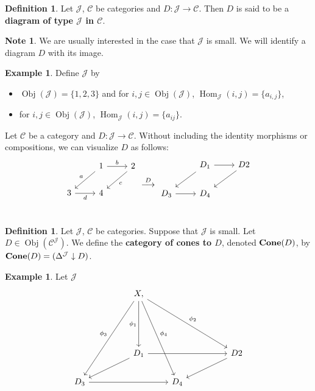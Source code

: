 \documentclass{book}
\theoremstyle{definition}
\newtheorem{defn}[definition]{Definition}
\newtheorem{note}[definition]{Note}
\newtheorem{exmp}[definition]{Example}
\newcommand{\Del}{\Delta}
\newcommand{\MC}{\mathcal{C}}
\newcommand{\MJ}{\mathcal{J}}
\DeclareMathOperator{\Obj}{Obj}
\DeclareMathOperator{\Hom}{Hom}
\DeclareMathOperator*{\0}{\mbf{0}}
\DeclareMathOperator*{\1}{\mbf{1}}
\DeclareMathOperator*{\Cone}{\text{\tbf{Cone}}}
\newcommand{\tbf}[1]{\textbf{#1}}
\begin{document}
	\begin{defn}
		Let $\MJ$, $\MC$ be categories and $D: \MJ \rightarrow \MC$. Then $D$ is said to be a \textbf{diagram of type $\MJ$ in $\MC$}.
	\end{defn}

	\begin{note}
		We are usually interested in the case that $\MJ$ is small. We will identify a diagram $D$ with its image. 
	\end{note}

	\begin{exmp}
		Define $\MJ$ by
		\begin{itemize}
			\item  $\Obj(\MJ) = \{1, 2, 3\}$ and for $i,j \in \Obj(\MJ)$, $\Hom_{\MJ}(i, j) = \{a_{i,j}\}$,
			\item for $i,j \in \Obj(\MJ)$, $\Hom_{\MJ}(i,j) = \{a_{ij}\}$.
		\end{itemize}
		Let $\MC$ be a category and $D: \MJ \rightarrow \MC$. Without including the identity morphisms or compositions, we can visualize $D$ as follows:
		\[
		\begin{tikzcd}
			&     1  \arrow[dl, "a"'] \arrow[r, "b"]        &  2 \arrow[dl, "c"] \\
			3 \arrow[r, "d"'] &        4   & \\
		\end{tikzcd}
		\overset{D}{\longrightarrow}
		\begin{tikzcd}
			&     D_1  \arrow[dl] \arrow[r]        &  D2 \arrow[dl] \\
			D_3 \arrow[r] &        D_4   & \\
		\end{tikzcd}
		\]
	\end{exmp}

	\begin{defn}
		Let $\MJ$, $\MC$ be categories. Suppose that $\MJ$ is small. Let $D \in \Obj(\MC^{\MJ})$. We define the \textbf{category of cones to $D$}, denoted $\Cone(D)$, by $\Cone(D) = (\Del^{\MJ} \downarrow D)$.
	\end{defn}


	\begin{exmp}
		Let $\MJ$
		\[
		\begin{tikzcd}
			&  &  X \arrow[ddd, "\phi_1"'] \arrow[ddddll, "\phi_3"']  \arrow[dddrrr, "\phi_2"], \arrow[ddddr, "\phi_4"] &       &    \\
			&       &     &       &    \\
			&       &     &       &    \\
			&       &  D_1  \arrow[dll] \arrow[rrr]    &       & &  D2 \arrow[dll] \\
			D_3 \arrow[rrr] &       &     &  D_4  &    \\
		\end{tikzcd}
		\]
	\end{exmp}
	
\end{document}
